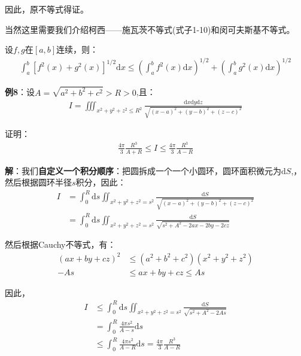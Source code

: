 \documentclass{ctexart}
\let\oldtextbf\textbf
\renewcommand{\textbf}[1]{\textcolor{brown!50!red}{\oldtextbf{#1}}}
\begin{document}
\noindent 因此，原不等式得证。

当然这里需要我们介绍柯西——施瓦茨不等式(式子1-10)和闵可夫斯基不等式。
\begin{tcolorbox}[
    colback=bac1,     %
    colframe=fra1,   %
    coltitle=white,             %
    coltext=tex1,
    title=闵可夫斯基不等式,
    fonttitle=\bfseries,        %
arc=3mm,                     %
breakable
]
设$f,g$在$[a,b]$连续，则：
\begin{align*} 
\int_a^b [f^2(x)+g^2(x)]^{1/2}\mathrm{d}x\leq\left(\int_a^bf^2(x)\mathrm{d}x \right)^{1/2}
+\left(\int_a^bg^2(x)\mathrm{d}x \right)^{1/2}\tag{1-24} 
\end{align*}
\end{tcolorbox}

\textbf{\color{brown!50!red}例8}：设$A=\sqrt{a^2+b^2+c^2}>R>0$,且：
\begin{align*} 
I=\iiint_{x^2+y^2+z^2\leq R^2}\frac{\mathrm{d}x\mathrm{d}y\mathrm{d}z   }{\sqrt{(x-a)^2+(y-b)^2+(z-c)^2}}   
\end{align*}

证明：
\begin{align*} 
\frac{4\pi}{3}\frac{R^3}{A+R}\leq I\leq \frac{4\pi}{3}\frac{R^3}{A-R}   
\end{align*}

\textbf{\color{brown!50!red}解}：我们\textbf{\color{brown!50!red}自定义一个积分顺序}：把圆拆成一个一个小圆环，圆环面积微元为$\mathrm{d}S$,，然后根据圆环半径$s$积分，因此：
\begin{align*} 
I&=\int_0^R\mathrm{d}s\iint_{x^2+y^2+z^2=s^2} \frac{\mathrm{d}S}{\sqrt{(x-a)^2+(y-b)^2+(z-c)^2}}\\
&= \int_0^R\mathrm{d}s\iint_{x^2+y^2+z^2=s^2} \frac{\mathrm{d}S}{\sqrt{s^2+A^2-2ax-2by-2cz}}
\end{align*}

然后根据Cauchy不等式，有：
\begin{align*} 
(ax+by+cz)^2&\leq(a^2+b^2+c^2)(x^2+y^2+z^2)\\
-As&\leq ax+by+cz\leq As
\end{align*}

因此，
\begin{align*} 
I&\leq\int_0^R\mathrm{d}s\iint_{x^2+y^2+z^2=s^2} \frac{\mathrm{d}S}{\sqrt{s^2+A^2-2As}}\\
&=\int_0^R\frac{4\pi s^2}{A-s} \mathrm{d}s\\
&\leq  \int_0^R\frac{4\pi s^2}{A-R} \mathrm{d}s=\frac{4\pi}{3}\frac{R^3}{A-R}  
\end{align*}
\end{document}
